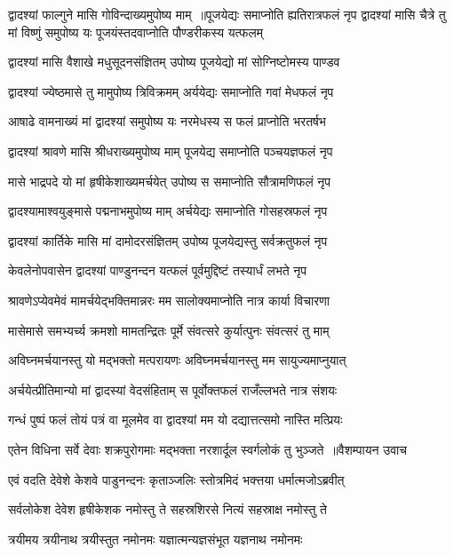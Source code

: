 द्वादश्यां फाल्गुने मासि गोविन्दाख्यमुपोष्य माम् ॥पूजयेद्यः समाप्नोति ह्यतिरात्रफलं नृप
\twolineshloka
{द्वादश्यां मासि चैत्रे तु मां विष्णुं समुपोष्य यः}
{पूजयंस्तदवाप्नोति पौण्डरीकस्य यत्फलम्}


\twolineshloka
{द्वादश्यां मासि वैशाखे मधुसूदनसंज्ञितम्}
{उपोष्य पूजयेद्यो मां सोग्निष्टोमस्य पाण्डव}


\twolineshloka
{द्वादश्यां ज्येष्ठमासे तु मामुपोष्य त्रिविक्रमम्}
{अर्ययेद्यः समाप्नोति गवां मेधफलं नृप}


\twolineshloka
{आषाढे वामनाख्यं मां द्वादश्यां समुपोष्य यः}
{नरमेधस्य स फलं प्राप्नोति भरतर्षभ}


\twolineshloka
{द्वादश्यां श्रावणे मासि श्रीधराख्यमुपोष्य माम्}
{पूजयेद्य समाप्नोति पञ्चयज्ञफलं नृप}


\twolineshloka
{मासे भाद्रपदे यो मां हृषीकेशाख्यमर्चयेत्}
{उपोष्य स समाप्नोति सौत्रामणिफलं नृप}


\twolineshloka
{द्वादश्यामाश्वयुङ्मासे पद्मनाभमुपोष्य माम्}
{अर्चयेद्यः समाप्नोति गोसहस्रफलं नृप}


\twolineshloka
{द्वादश्यां कार्तिके मासि मां दामोदरसंज्ञितम्}
{उपोष्य पूजयेद्यस्तु सर्वक्रतुफलं नृप}


\twolineshloka
{केवलेनोपवासेन द्वादश्यां पाण्डुनन्दन}
{यत्फलं पूर्वमुद्दिष्टं तस्यार्धं लभते नृप}


\twolineshloka
{श्रावणेऽप्येवमेवं मामर्चयेद्भक्तिमान्नरः}
{मम सालोक्यमाप्नोति नात्र कार्या विचारणा}


\twolineshloka
{मासेमासे समभ्यर्च्य क्रमशो मामतन्द्रितः}
{पूर्मे संवत्सरे कुर्यात्पुनः संवत्सरं तु माम्}


\twolineshloka
{अविघ्नमर्चयानस्तु यो मद्भक्तो मत्परायणः}
{अविघ्नमर्चयानस्तु मम सायुज्यमाप्नुयात्}


\twolineshloka
{अर्चयेत्प्रीतिमान्यो मां द्वादस्यां वेदसंहिताम्}
{स पूर्वोक्तफलं राजँल्लभते नात्र संशयः}


\twolineshloka
{गन्धं पुष्पं फलं तोयं पत्रं वा मूलमेव वा}
{द्वादश्यां मम यो दद्यात्तत्समो नास्ति मत्प्रियः}


\threelineshloka
{एतेन विधिना सर्वे देवाः शक्रपुरोगमाः}
{मद्भक्ता नरशार्दूल स्वर्गलोकं तु भुञ्जते ॥वैशम्पायन उवाच}
{}


\twolineshloka
{एवं वदति देवेशे केशवे पाडुनन्दनः}
{कृताञ्जलिः स्तोत्रमिदं भक्त्तया धर्मात्मजोऽब्रवीत्}


\twolineshloka
{सर्वलोकेश देवेश हृषीकेशक नमोस्तु ते}
{सहस्रशिरसे नित्यं सहस्राक्ष नमोस्तु ते}


\twolineshloka
{त्रयीमय त्रयीनाथ त्रयीस्तुत नमोनमः}
{यज्ञात्मन्यज्ञसंभूत यज्ञनाथ नमोनमः}


